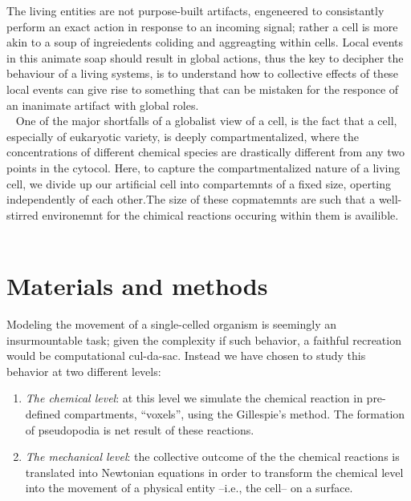 \documentclass[10pt,letterpaper]{article}
\begin{document}
The living entities are not purpose-built artifacts, engeneered to consistantly perform an exact action in response to an incoming signal; rather a cell is more akin to a soup of ingreiedents coliding and aggreagting within cells. Local events in this animate soap should result in global actions, thus the key to decipher the behaviour of a living systems, is to understand how to collective effects of these local events can give rise to something that can be mistaken for the responce of an inanimate artifact with global roles.\\~
One of the major shortfalls of a globalist view of a cell, is the fact that a cell, especially of eukaryotic variety, is deeply compartmentalized, where the concentrations of different chemical species are drastically different from any two points in the cytocol. Here, to capture the compartmentalized nature of a living cell, we divide up our artificial cell into compartemnts of a fixed size, operting independently of each other.The size of these copmatemnts are such that a well-stirred environemnt for the chimical reactions occuring within them is availible. \\~





\section*{Materials and methods}

Modeling the movement of a single-celled organism is seemingly an insurmountable task; given the complexity if such behavior, a faithful recreation would be computational cul-da-sac. Instead we have chosen to study this behavior at two different levels: 

\begin{enumerate}

\item \textit{The chemical level}: at this level we simulate the chemical reaction in pre-defined compartments, ``voxels'', using the Gillespie's method. The formation of pseudopodia is net result of these reactions.

\item \textit{The mechanical level}: the collective outcome of the the chemical reactions is translated into Newtonian equations in order to transform the chemical level into the movement of a physical entity --i.e., the cell-- on a surface.
\end{enumerate}
\end{document}
